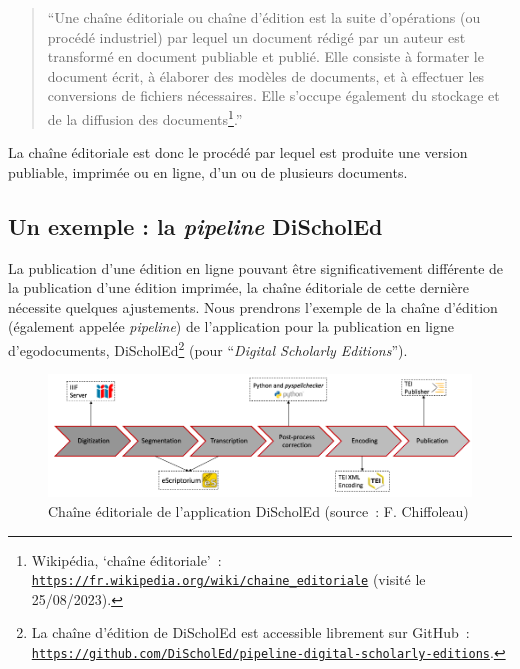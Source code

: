 \begin{quote}
    \enquote{Une chaîne éditoriale ou chaîne d'édition est la suite d'opérations (ou procédé industriel) par lequel un document rédigé par un auteur est transformé en document publiable et publié. Elle consiste à formater le document écrit, à élaborer des modèles de documents, et à effectuer les conversions de fichiers nécessaires. Elle s'occupe également du stockage et de la diffusion des documents\footnote{Wikipédia, \enquote{chaîne éditoriale}~: \texttt{\href{https://fr.wikipedia.org/wiki/chaine_editoriale}{https://fr.wikipedia.org/wiki/chaine\_editoriale}} (visité le 25/08/2023).}.}
\end{quote}  

La chaîne éditoriale est donc le procédé par lequel est produite une version publiable, imprimée ou en ligne, d'un ou de plusieurs documents.  


\subsection{Un exemple : la \textit{pipeline} DiScholEd}
La publication d'une édition en ligne pouvant être significativement différente de la publication d'une édition imprimée, la chaîne éditoriale de cette dernière nécessite quelques ajustements. Nous prendrons l'exemple de la chaîne d'édition (également appelée \textit{pipeline}) de l'application pour la publication en ligne d'egodocuments, DiScholEd\footnote{La chaîne d'édition de DiScholEd est accessible librement sur GitHub~: \texttt{\href{https://github.com/DiScholEd/pipeline-digital-scholarly-editions}{https://github.com/DiScholEd/pipeline-digital-scholarly-editions}}.} (pour \enquote{\textit{Digital Scholarly Editions}}).  

\begin{figure}[h]
    \centering
    \includegraphics[width=1\linewidth]{2-MAIN//images/pipeline-discholed.png}
    \caption{Chaîne éditoriale de l'application DiScholEd (source~: F. Chiffoleau)}
    \label{fig:pipeline-discholed}
\end{figure}  

